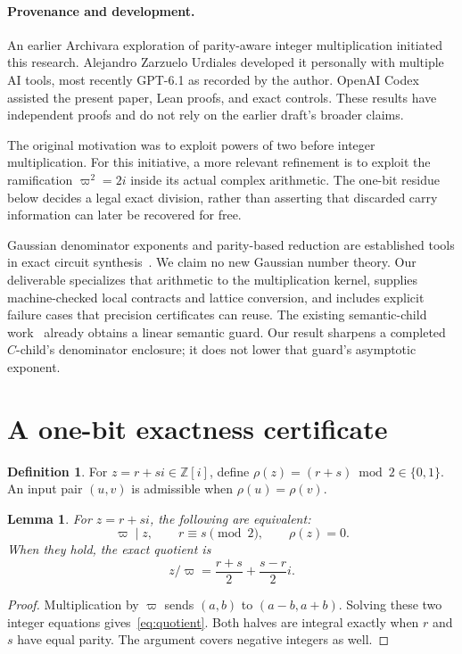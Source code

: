 \documentclass[11pt]{article}
\newtheorem{lemma}[theorem]{Lemma}
\theoremstyle{definition}\newtheorem{definition}[theorem]{Definition}
\theoremstyle{remark}\newtheorem{remark}[theorem]{Remark}
\newcommand{\G}{\mathbb Z[i]}
\newcommand{\p}{\varpi}
\newcommand{\res}{\rho}
\begin{document}
\paragraph{Provenance and development.}
An earlier Archivara exploration of parity-aware integer multiplication initiated this research. Alejandro Zarzuelo Urdiales developed it personally with multiple AI tools, most recently GPT-6.1 as recorded by the author. OpenAI Codex assisted the present paper, Lean proofs, and exact controls. These results have independent proofs and do not rely on the earlier draft's broader claims.

The original motivation was to exploit powers of two before integer multiplication. For this initiative, a more relevant refinement is to exploit the ramification $\p^2=2i$ inside its actual complex arithmetic. The one-bit residue below decides a legal exact division, rather than asserting that discarded carry information can later be recovered for free.

Gaussian denominator exponents and parity-based reduction are established tools in exact circuit synthesis~\cite[Section~5.4, Eq.~(11), Lemmas~5.23--5.24]{agr}. We claim no new Gaussian number theory. Our deliverable specializes that arithmetic to the multiplication kernel, supplies machine-checked local contracts and lattice conversion, and includes explicit failure cases that precision certificates can reuse. The existing semantic-child work~\cite{chen,rad} already obtains a linear semantic guard. Our result sharpens a completed $C$-child's denominator enclosure; it does not lower that guard's asymptotic exponent.

\section{A one-bit exactness certificate}
\begin{definition}
For $z=r+si\in\G$, define $\res(z)=(r+s)\bmod2\in\{0,1\}$. An input pair $(u,v)$ is admissible when $\res(u)=\res(v)$.
\end{definition}
\begin{lemma}\label{lem:division}
For $z=r+si$, the following are equivalent:
\[
 \p\mid z,\qquad r\equiv s\pmod2,\qquad \res(z)=0.
\]
When they hold, the exact quotient is
\begin{equation}\label{eq:quotient}
 z/\p=\frac{r+s}{2}+\frac{s-r}{2}i.
\end{equation}
\end{lemma}
\begin{proof}
Multiplication by $\p$ sends $(a,b)$ to $(a-b,a+b)$. Solving these two integer equations gives~\eqref{eq:quotient}. Both halves are integral exactly when $r$ and $s$ have equal parity. The argument covers negative integers as well.
\end{proof}
\end{document}
